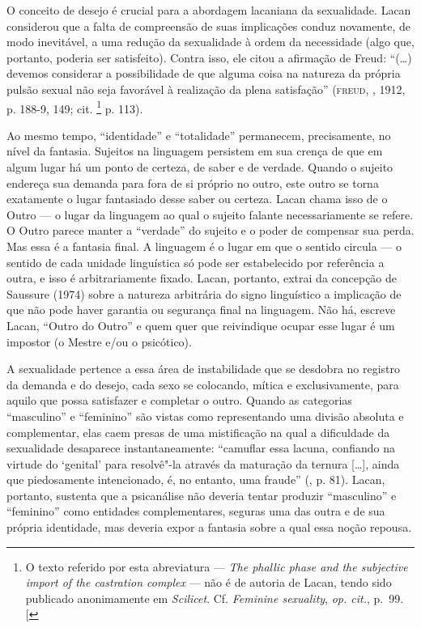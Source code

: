 O conceito de desejo é crucial para a abordagem lacaniana da
sexualidade. Lacan considerou que a falta de compreensão de suas
implicações conduz novamente, de modo inevitável, a uma redução da
sexualidade à ordem da necessidade (algo que, portanto, poderia ser
satisfeito). Contra isso, ele citou a afirmação de Freud: ``(\ldots{})
devemos considerar a possibilidade de que alguma coisa na natureza da
própria pulsão sexual não seja favorável à realização da plena
satisfação'' (\textsc{freud}, , 1912, p. 188-9, 149; cit. \footnote{O texto
  referido por esta abreviatura --- \emph{The phallic phase and the
  subjective import of the castration complex} --- não é de autoria de
  Lacan, tendo sido publicado anonimamente em \emph{Scilicet}. Cf.
  \emph{Feminine sexuality}, \emph{op. cit.}, p.~99. {[}\versal{N.~T.}{]}} p.
113).

Ao mesmo tempo, ``identidade'' e ``totalidade'' permanecem,
precisamente, no nível da fantasia. Sujeitos na linguagem persistem em
sua crença de que em algum lugar há um ponto de certeza, de saber e de
verdade. Quando o sujeito endereça sua demanda para fora de si próprio
no outro, este outro se torna exatamente o lugar fantasiado desse saber
ou certeza. Lacan chama isso de o Outro --- o lugar da linguagem ao qual
o sujeito falante necessariamente se refere. O Outro parece manter a
``verdade'' do sujeito e o poder de compensar sua perda. Mas essa é a
fantasia final. A linguagem é o lugar em que o sentido circula --- o
sentido de cada unidade linguística só pode ser estabelecido por
referência a outra, e isso é arbitrariamente fixado. Lacan, portanto,
extrai da concepção de Saussure (1974) sobre a natureza arbitrária do signo
linguístico a implicação de que não pode haver
garantia ou segurança final na linguagem. Não há, escreve Lacan, ``Outro
do Outro'' e quem quer que reivindique ocupar esse lugar é um impostor
(o Mestre e/ou o psicótico).

A sexualidade pertence a essa área de instabilidade que se desdobra no
registro da demanda e do desejo, cada sexo se colocando, mítica e
exclusivamente, para aquilo que possa satisfazer e completar o outro.
Quando as categorias ``masculino'' e ``feminino'' são vistas como
representando uma divisão absoluta e complementar, elas caem presas de
uma mistificação na qual a dificuldade da sexualidade desaparece
instantaneamente: ``camuflar essa lacuna, confiando na virtude do
`genital' para resolvê"-la através da maturação da ternura {[}\ldots{}{]},
ainda que piedosamente intencionado, é, no entanto, uma fraude'' (, p.
81). Lacan, portanto, sustenta que a psicanálise não deveria tentar
produzir ``masculino'' e ``feminino'' como entidades complementares,
seguras uma das outra e de sua própria identidade, mas deveria expor a
fantasia sobre a qual essa noção repousa.


